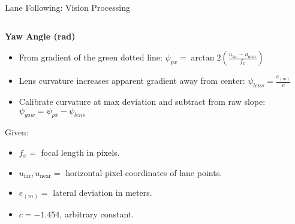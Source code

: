 \documentclass[aspectratio=169,12pt]{beamer}
\begin{document}
\begin{frame}[t]{Lane Following: Vision Processing}

  \vspace{0.3em}
  \begin{columns}[T]
    \begin{column}{0.58\textwidth}
    
      \textbf{Yaw Angle (rad)}
      \begin{itemize}\setlength{\itemsep}{0.3em}
        \item From gradient of the green dotted line: \( \psi_{px} = \arctan2 \left( \frac{u_{\text{far}} - u_{\text{near}}}{f_x}\right) \)
        \item Lens curvature increases apparent gradient away from center: \(\psi_{lens} = \frac{e_{(m)}}{c} \)
        \item Calibrate curvature at max deviation and subtract from raw slope: \(\psi_{yaw} = \psi_{px} - \psi_{lens}\)
      \end{itemize}
      Given:
        {\footnotesize
        \begin{itemize}\setlength{\itemsep}{0.3em}
          \item \(f_x=\) focal length in pixels.
          \item \(u_{\text{far}}, u_{\text{near}} =\) horizontal pixel coordinates of lane points.
          \item \(e_{(m)} =\) lateral deviation in meters.
          \item \(c=-1.454\), arbitrary constant.
        \end{itemize}
        }

    \end{column}
    \begin{column}{0.42\textwidth}
      \centering

    \end{column}
  \end{columns}
\end{frame}
\end{document}
